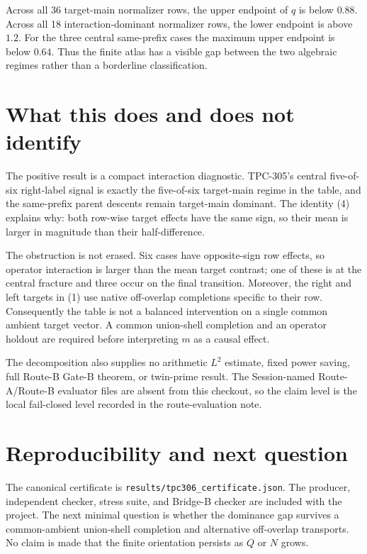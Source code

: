 \documentclass[11pt]{article}
\begin{document}
Across all 36 target-main normalizer rows, the upper endpoint of $q$ is below
$0.88$.  Across all 18 interaction-dominant normalizer rows, the lower
endpoint is above $1.2$.  For the three central same-prefix cases the maximum
upper endpoint is below $0.64$.  Thus the finite atlas has a visible gap
between the two algebraic regimes rather than a borderline classification.

\section{What this does and does not identify}

The positive result is a compact interaction diagnostic.  TPC-305's central
five-of-six right-label signal is exactly the five-of-six target-main regime
in the table, and the same-prefix parent descents remain target-main dominant.
The identity (4) explains why: both row-wise target effects have the same
sign, so their mean is larger in magnitude than their half-difference.

The obstruction is not erased.  Six cases have opposite-sign row effects, so
operator interaction is larger than the mean target contrast; one of these is
at the central fracture and three occur on the final transition.  Moreover,
the right and left targets in (1) use native off-overlap completions specific
to their row.  Consequently the table is not a balanced intervention on a
single common ambient target vector.  A common union-shell completion and an
operator holdout are required before interpreting $m$ as a causal effect.

The decomposition also supplies no arithmetic $L^2$ estimate, fixed power
saving, full Route-B Gate-B theorem, or twin-prime result.  The Session-named
Route-A/Route-B evaluator files are absent from this checkout, so the claim
level is the local fail-closed level recorded in the route-evaluation note.

\section*{Reproducibility and next question}

The canonical certificate is
\texttt{results/tpc306\_certificate.json}.  The producer, independent checker,
stress suite, and Bridge-B checker are included with the project.  The next
minimal question is whether the dominance gap survives a common-ambient
union-shell completion and alternative off-overlap transports.  No claim is
made that the finite orientation persists as $Q$ or $N$ grows.



\end{document}
